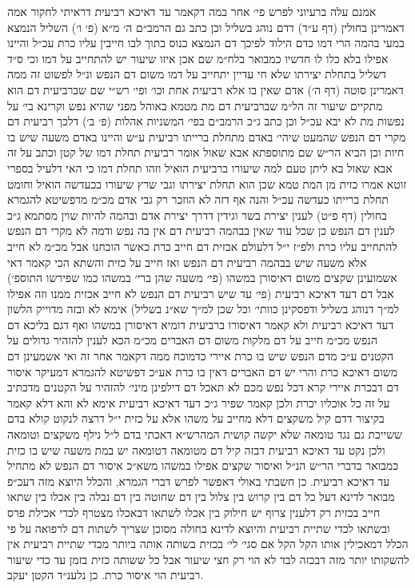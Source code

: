 \documentclass[12pt, openany]{book}
\begin{document}
\begin{multicols}{2}
אמנם עלה ברעיוני לפרש פי׳ אחר במה דקאמר עד דאיכא רביעית דראיתי לחקור אמה דאמרינן בחולין (דף ע״ד) דדם נוהג בשליל וכן כתב גם הרמב״ם ה׳ מ״א (פ׳ ו׳) השליל הנמצא במעי בהמה הרי דמו כדם הילוד לפיכך דם הנמצא כנוס בתוך לבו חייבין עליו כרת עכ״ל והיינו אפילו בלא כלו לו חדשיו כמבואר בלח״מ שם אכן איזו שיעור יש להתחייב על דמו וכי ס״ד דשליל בתחלת יצירתו שלא חי עדיין יתחייב על דמו משום דם הנפש ונ״ל לפשוט זה ממה דאמרינן סוטה (דף ה׳) אדם שאין בו אלא רביעית אחת וכו׳ ופי׳ רש״י שם שברביעית דם הוא מתקיים שיעור זה הל״מ שברביעית דם מת מטמא באוהל מפני שהיא נפש וקרינא בי׳ על נפשות מת לא יבא עכ״ל וכן כתב ג״כ הרמב״ם בפי׳ המשניות אהלות (פ׳ ב׳) דלכך רביעית דם מקרי דם הנפש שהמעט שיהי׳ באדם מתחלת ברייתו רביעית ע״ש והיינו באדם משעה שיש בו חיות וכן הביא הר״ש שם מתוספתא אבא שאול אומר רביעית תחלת דמו של קטן וכתב על זה אבא שאול בא ליתן טעם למה שיעורו ברביעית הואיל וזהו תחלת דמו כי האי דלעיל בספרי זוטא אמרו כזית מן המת טמא שכן הוא תחלת יצירתו וגבי שרץ שיעורו בכעדשה הואיל וחומט תחלת ברייתו כעדשה עכ״ל והנה אף דזה לא הוזכר רק גבי אדם מכ״מ מדפשיטא להגמרא בחולין (דף פ״ט) לענין יצירת בשר וגידין דדרך יצירת אדם ובהמה להיות שוין מסתמא ג״כ לענין דם הנפש כן שכל עוד שאין בבהמה רביעית דם אין בה נפש ודמה לא מקרי דם הנפש להתחייב עליו כרת ולפ״ז י״ל דלעולם אכזית דם חייב כרת כאשר הוכחנו אבל מכ״מ לא חייב אלא משעה שיש בבהמה רביעית דם הנפש ואז חייב על כזית והשתא הכי קאמר דאי אשמועינן שקצים משום דאיסורן במשהו (פי׳ משעה שהן ברי׳ במשהו כמו שפירשו התוספ׳) אבל דם דעד דאיכא רביעית (פי׳ עד שיש רביעית דם הנפש לא חייב אכזית ממנו וזה אפילו למ״ך דנוהג בשליל ודפסקינן כוותי׳ וכל שכן למ״ך שא״נ בשליל) אימא לא ובזה מדוייק הלשון דעד דאיכא רביעית ולא קאמר דאיסורו ברביעית דומיא דאיסורן במשהו ואף דגם בליכא דם הנפש מכ״מ חייב על דם מלקות משום דם האברים מכ״מ הכא לענין להזהיר גדולים על הקטנים ע״כ מדם הנפש שיש בו כרת איירי כדמוכח ממה דקאמר אחר זה ואי אשמעינן דם משום דאיכא כרת והרי יש דם האברים דאין בו כרת אע״כ דפשיטא להגמרא דמעיקר איסור דם דבכרת איירי קרא דכל נפש מכם לא תאכל דם דילפינן מיני׳ להזהיר על הקטנים מדכתיב על זה כל אוכליו יכרת ולכן קאמר שפיר ג״כ דעד דאיכא רביעית אימא לא והא דלא קאמר בקיצור דדם קיל משקצים דלא מחייב על משהו אלא על כזית י״ל דרצה לנקוט קולא בדם ששייכת גם נגד טומאה שלא יקשה קושית המהרש״א דאכתי בדם ל״ל נילף משקצים וטומאה ולכן נקט עד דאיכא רביעית דבזה קיל דם מטומאה דטומאה יש במת משעה שיש בו כזית כמבואר בדברי הר״ש הנ״ל ואיסור שקצים אפילו במשהו משא״כ איסור דם הנפש לא מתחיל עד דאיכא רביעית. כן חשבתי באולי דאפשר לפרש דברי הגמרא, והכלל היוצא מזה דעכ״פ מבואר לדינא דעל כל דם בין קרוש בין צלול בין דם שחוטה בין דם נבלה בין אכלו בין שתאו חייב בכזית רק דלענין צרוף יש חילוק בין אכלו לשתאו דבאכלו מצטרף לכדי אכילת פרס ובשתאו לכדי שתיית רביעית והיוצא לדינא בחולה מסוכן שצריך לשתות דם לרפואה על פי הכלל דמאכילין אותו הקל הקל אם סגי׳ לי׳ בכזית בשותה אותה ביותר מכדי שתיית רביעית אין להשקותו יותר מזה דבכזה לבד לא הוי רק חצי שיעור אבל כל ששותה כזית בזמן עד כדי שיעור רביעית הוי איסור כרת. כן נלענ״ד הקטן יעקב.\\\vspace{0pt}

\end{multicols}\newpage
\end{document}
